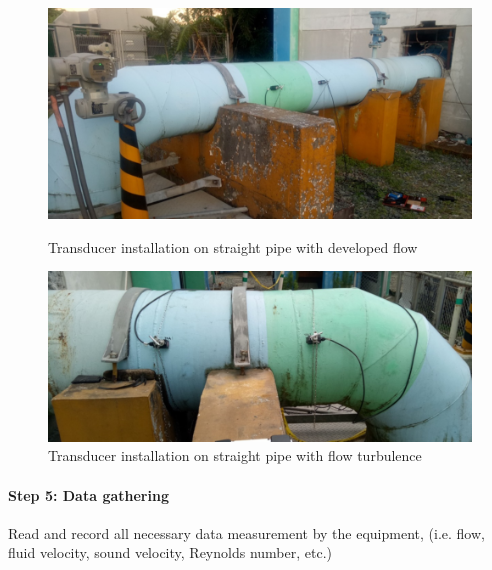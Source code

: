 \begin{figure}[ht]
	\begin{minipage}[b]{0.5\linewidth}
		\centering
		\includegraphics[width=\textwidth]{figures/ch02_flowmeasurement05}
		\caption{Transducer installation on straight pipe with developed flow}
		\label{ch02_flowmeasurement05}
	\end{minipage}
	\hspace{0.05cm}
	\begin{minipage}[b]{0.5\linewidth}
		\centering
		\includegraphics[width=\textwidth]{figures/ch02_flowmeasurement06}
		\caption{Transducer installation on straight pipe with flow turbulence}
		\label{ch02_flowmeasurement06}
	\end{minipage}
\end{figure}


\paragraph{Step 5: Data gathering}
Read and record all necessary data measurement by the equipment, (i.e. flow, fluid velocity, sound velocity, Reynolds number, etc.) 

